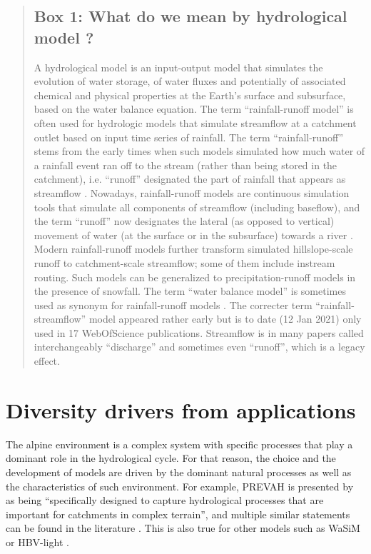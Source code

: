 \documentclass[10pt,a4paper]{article}
\begin{document}
\begin{quote}
\subsection*{Box 1: What do we mean by hydrological model ?}
\label{box:1}

A hydrological model is an input-output model that simulates the evolution of water storage, of water fluxes and potentially of associated chemical and physical properties at the Earth's surface and subsurface, based on the water balance equation. The term ``rainfall-runoff model'' is often used for hydrologic models that simulate streamflow at a catchment outlet based on input time series of rainfall. The term ``rainfall-runoff'' stems from the early times when such models simulated how much water of a rainfall event ran off to the stream (rather than being stored in the catchment), i.e. ``runoff'' designated the part of rainfall that appears as streamflow \citep{WMO1992}. Nowadays, rainfall-runoff models are continuous simulation tools that simulate all components of streamflow (including baseflow), and the term ``runoff'' now designates the lateral (as opposed to vertical) movement of water (at the surface or in the subsurface) towards a river \citep{WMO2012}. Modern rainfall-runoff models further transform simulated hillslope-scale runoff to catchment-scale streamflow; some of them include instream routing. Such models can be generalized to precipitation-runoff models in the presence of snowfall. The term ``water balance model'' is sometimes used as synonym for rainfall-runoff models \citep{Boughton2004} . The correcter term ``rainfall-streamflow'' model appeared rather early \citep{Young1991} but is to date (12 Jan 2021) only used in 17 WebOfScience publications. Streamflow is in many papers called interchangeably ``discharge'' and sometimes even ``runoff'', which is a legacy effect.  \end{quote}


\section{Diversity drivers from applications}
\label{sec:application}

The alpine environment is a complex system with specific processes that play a dominant role in the hydrological cycle. For that reason, the choice and the development of models are driven by the dominant natural processes as well as the characteristics of such environment. For example, PREVAH is presented by \citet{Anghileri2019} as being “specifically designed to capture hydrological processes that are important for catchments in complex terrain”, and multiple similar statements can be found in the literature \citep{Verbunt2007, Zappa2007a, Koplin2010,  Brunner2019e}. This is also true for other models such as WaSiM \citep{Jasper2002, Jasper2003, Thornton2021} or HBV-light \citep{SikorskaSenoner2020}. 
\end{document}
